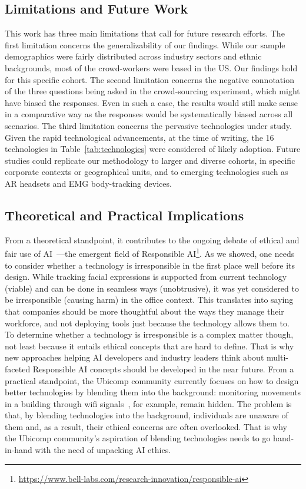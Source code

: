 \subsection{Limitations and Future Work}
This work has three main limitations that call for future research efforts. The first limitation concerns the generalizability of our findings. While our sample demographics were fairly distributed across industry sectors and ethnic backgrounds, most of the crowd-workers were based in the US. Our findings hold for this specific cohort. The second limitation concerns the negative connotation of the three questions being asked in the crowd-sourcing experiment, which might have biased the responses. Even in such a case, the results would still make sense in a comparative way as the responses would be systematically biased across all scenarios. The third limitation concerns the pervasive technologies under study. Given the rapid technological advancements, at the time of writing, the 16 technologies in Table~\ref{tab:technologies} were considered of likely adoption. Future studies could replicate our methodology to larger and diverse cohorts, in specific corporate contexts or geographical units, and to
emerging technologies such as AR headsets and EMG body-tracking devices.

\subsection{Theoretical and Practical Implications}
From a theoretical standpoint, it contributes to the ongoing debate of ethical and fair use of AI~\cite{arrieta2020explainable}---the emergent field of Responsible AI\footnote{\url{https://www.bell-labs.com/research-innovation/responsible-ai}}. As we showed, one needs to consider whether a technology is irresponsible in the first place well before its design. While tracking facial expressions is supported from current technology (viable) and can be done in seamless ways (unobtrusive), it was yet considered to be irresponsible (causing harm) in the office context. This translates into saying that companies should be more thoughtful about the ways they manage their workforce, and not deploying tools just because the technology allows them to. To determine whether a technology is irresponsible is a complex matter though, not least because it entails ethical concepts that are hard to define. That is why new approaches helping AI developers and industry leaders think about multi-faceted Responsible AI concepts should be developed in the near future.
From a practical standpoint, the Ubicomp community currently focuses on how to design better technologies by blending them into the background: monitoring movements in a building through wifi signals~\cite{adib2013see}, for example, remain hidden. The problem is that, by blending technologies into the background, individuals are unaware of them and, as a result, their ethical concerns are often overlooked. That is why the Ubicomp community's aspiration of blending technologies needs to go hand-in-hand with the need of unpacking AI ethics.